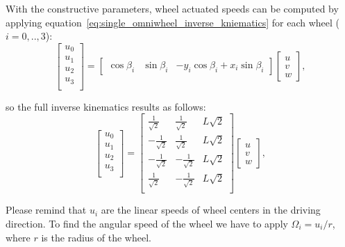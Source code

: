 With the constructive parameters, wheel actuated speeds can be computed by applying equation~\ref{eq:single_omniwheel_inverse_kniematics} for each wheel ($i=0,..,3$):
\begin{equation}
\left[
\begin{array}{c}
u_0 \\
u_1 \\
u_2 \\
u_3 \\
\end{array}
\right]
=
\left[
\begin{array}{ccc}
 \cos \beta_i & \sin \beta_i & -y_i\cos \beta_i+x_i \sin \beta_i
\end{array}
\right]
\left[
\begin{array}{c}
 u \\
 v\\
 w
\end{array}
\right], 
\end{equation}

so the full inverse kinematics results as follows: 
\begin{equation}
\left[
\begin{array}{c}
u_0 \\
u_1 \\
u_2 \\
u_3 \\
\end{array}
\right]
=
\left[
\begin{array}{ccc}
 \frac{1}{\sqrt{2}} & \frac{1}{\sqrt{2}} & L\sqrt{2} \\
 -\frac{1}{\sqrt{2}} & \frac{1}{\sqrt{2}} & L\sqrt{2} \\
 -\frac{1}{\sqrt{2}} & -\frac{1}{\sqrt{2}} & L\sqrt{2} \\
 \frac{1}{\sqrt{2}} & -\frac{1}{\sqrt{2}} & L\sqrt{2} \\
\end{array}
\right]
\left[
\begin{array}{c}
 u \\
 v\\
 w
\end{array}
\right], 
\end{equation}

Please remind that $u_i$ are the linear speeds of wheel centers in the driving direction. To find the angular speed of the wheel we have to apply $\Omega_i = u_i/r$, where $r$ is the radius of the wheel. 


